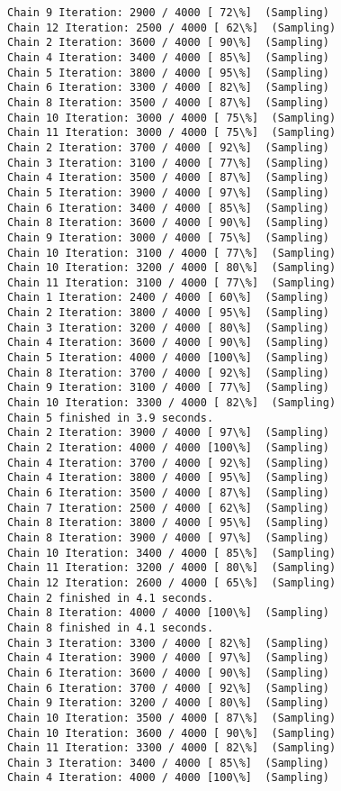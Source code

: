 \documentclass[11pt]{article}
\begin{document}
\begin{Verbatim}[commandchars=\\\{\}]
Chain 9 Iteration: 2900 / 4000 [ 72\%]  (Sampling)
Chain 12 Iteration: 2500 / 4000 [ 62\%]  (Sampling)
Chain 2 Iteration: 3600 / 4000 [ 90\%]  (Sampling)
Chain 4 Iteration: 3400 / 4000 [ 85\%]  (Sampling)
Chain 5 Iteration: 3800 / 4000 [ 95\%]  (Sampling)
Chain 6 Iteration: 3300 / 4000 [ 82\%]  (Sampling)
Chain 8 Iteration: 3500 / 4000 [ 87\%]  (Sampling)
Chain 10 Iteration: 3000 / 4000 [ 75\%]  (Sampling)
Chain 11 Iteration: 3000 / 4000 [ 75\%]  (Sampling)
Chain 2 Iteration: 3700 / 4000 [ 92\%]  (Sampling)
Chain 3 Iteration: 3100 / 4000 [ 77\%]  (Sampling)
Chain 4 Iteration: 3500 / 4000 [ 87\%]  (Sampling)
Chain 5 Iteration: 3900 / 4000 [ 97\%]  (Sampling)
Chain 6 Iteration: 3400 / 4000 [ 85\%]  (Sampling)
Chain 8 Iteration: 3600 / 4000 [ 90\%]  (Sampling)
Chain 9 Iteration: 3000 / 4000 [ 75\%]  (Sampling)
Chain 10 Iteration: 3100 / 4000 [ 77\%]  (Sampling)
Chain 10 Iteration: 3200 / 4000 [ 80\%]  (Sampling)
Chain 11 Iteration: 3100 / 4000 [ 77\%]  (Sampling)
Chain 1 Iteration: 2400 / 4000 [ 60\%]  (Sampling)
Chain 2 Iteration: 3800 / 4000 [ 95\%]  (Sampling)
Chain 3 Iteration: 3200 / 4000 [ 80\%]  (Sampling)
Chain 4 Iteration: 3600 / 4000 [ 90\%]  (Sampling)
Chain 5 Iteration: 4000 / 4000 [100\%]  (Sampling)
Chain 8 Iteration: 3700 / 4000 [ 92\%]  (Sampling)
Chain 9 Iteration: 3100 / 4000 [ 77\%]  (Sampling)
Chain 10 Iteration: 3300 / 4000 [ 82\%]  (Sampling)
Chain 5 finished in 3.9 seconds.
Chain 2 Iteration: 3900 / 4000 [ 97\%]  (Sampling)
Chain 2 Iteration: 4000 / 4000 [100\%]  (Sampling)
Chain 4 Iteration: 3700 / 4000 [ 92\%]  (Sampling)
Chain 4 Iteration: 3800 / 4000 [ 95\%]  (Sampling)
Chain 6 Iteration: 3500 / 4000 [ 87\%]  (Sampling)
Chain 7 Iteration: 2500 / 4000 [ 62\%]  (Sampling)
Chain 8 Iteration: 3800 / 4000 [ 95\%]  (Sampling)
Chain 8 Iteration: 3900 / 4000 [ 97\%]  (Sampling)
Chain 10 Iteration: 3400 / 4000 [ 85\%]  (Sampling)
Chain 11 Iteration: 3200 / 4000 [ 80\%]  (Sampling)
Chain 12 Iteration: 2600 / 4000 [ 65\%]  (Sampling)
Chain 2 finished in 4.1 seconds.
Chain 8 Iteration: 4000 / 4000 [100\%]  (Sampling)
Chain 8 finished in 4.1 seconds.
Chain 3 Iteration: 3300 / 4000 [ 82\%]  (Sampling)
Chain 4 Iteration: 3900 / 4000 [ 97\%]  (Sampling)
Chain 6 Iteration: 3600 / 4000 [ 90\%]  (Sampling)
Chain 6 Iteration: 3700 / 4000 [ 92\%]  (Sampling)
Chain 9 Iteration: 3200 / 4000 [ 80\%]  (Sampling)
Chain 10 Iteration: 3500 / 4000 [ 87\%]  (Sampling)
Chain 10 Iteration: 3600 / 4000 [ 90\%]  (Sampling)
Chain 11 Iteration: 3300 / 4000 [ 82\%]  (Sampling)
Chain 3 Iteration: 3400 / 4000 [ 85\%]  (Sampling)
Chain 4 Iteration: 4000 / 4000 [100\%]  (Sampling)

\end{Verbatim}
\end{document}
